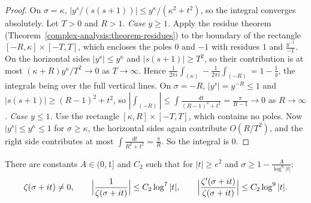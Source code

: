 \begin{proof}
On $\sigma = \kappa$, $|y^s/(s(s + 1))| \leq y^\kappa/(\kappa^2 + t^2)$, so the integral converges absolutely. Let $T > 0$ and $R > 1$.
\emph{Case $y \geq 1$.} Apply the residue theorem (Theorem~\ref{complex-analysis:theorem-residues}) to the boundary of the rectangle $[-R, \kappa] \times [-T, T]$, which encloses the poles $0$ and $-1$
with residues $1$ and $\frac{y^{-1}}{-1}$. On the horizontal sides $|y^s| \leq y^\kappa$ and $|s(s + 1)| \geq T^2$, so their contribution is at most $(\kappa + R)y^\kappa/T^2 \to 0$ as $T \to \infty$. Hence
$\frac{1}{2\pi i}\int_{(\kappa)} - \frac{1}{2\pi i}\int_{(-R)} = 1 - \frac1y$, the integrals being over the full vertical lines. On $\sigma = -R$, $|y^s| = y^{-R} \leq 1$ and
$|s(s + 1)| \geq (R - 1)^2 + t^2$, so $|\int_{(-R)}| \leq \int\frac{dt}{(R - 1)^2 + t^2} = \frac{\pi}{R - 1} \to 0$ as $R \to \infty$.
\emph{Case $y \leq 1$.} Use the rectangle $[\kappa, R] \times [-T, T]$, which contains no poles. Now $|y^s| \leq y^\kappa \leq 1$ for $\sigma \geq \kappa$, the horizontal sides again contribute $O(R/T^2)$, and
the right side contributes at most $\int\frac{dt}{R^2 + t^2} = \frac\pi R$. So the integral is $0$.
\end{proof}

\begin{proposition}\label{analytic-number-theory:proposition-zero-free}
There are constants $A \in (0, 1]$ and $C_2$ such that for $|t| \geq e^2$ and $\sigma \geq 1 - \frac{A}{\log^9|t|}$:
\[
\zeta(\sigma + it) \neq 0, \qquad \Bigl|\frac{1}{\zeta(\sigma + it)}\Bigr| \leq C_2\log^7|t|, \qquad \Bigl|\frac{\zeta^{\prime}(\sigma + it)}{\zeta(\sigma + it)}\Bigr| \leq C_2\log^9|t|.
\]
\end{proposition}

